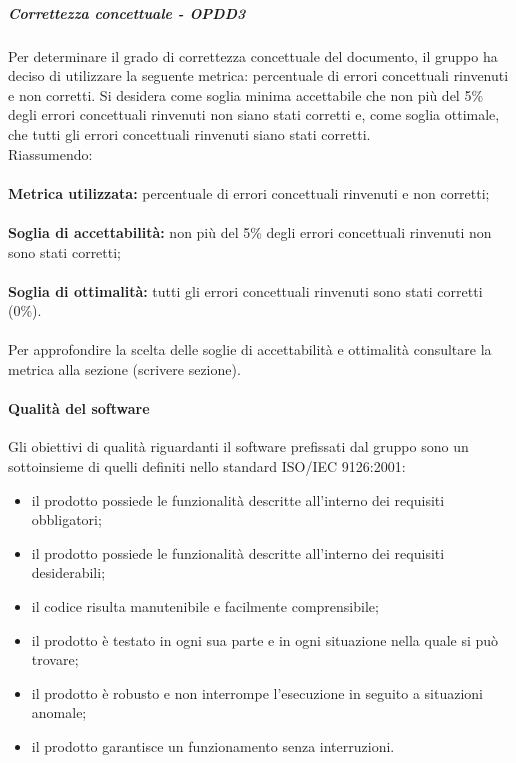 \documentclass[PianoDiQualifica.tex]{subfiles}
\begin{document}
				\subparagraph{Correttezza concettuale - OPDD3}
				Per determinare il grado di correttezza concettuale del documento, il gruppo ha deciso di utilizzare la seguente metrica: percentuale di errori concettuali rinvenuti e non corretti.
				Si desidera come soglia minima accettabile che non più del 5\% degli errori concettuali rinvenuti non siano stati corretti e, come soglia ottimale, che tutti gli errori
				concettuali rinvenuti siano stati corretti.\\
				Riassumendo: \\ \\
				\textbf{Metrica utilizzata:} percentuale di errori concettuali rinvenuti e non corretti; \\ \\
				\textbf{Soglia di accettabilità:} non più del 5\% degli errori concettuali rinvenuti non sono stati corretti;\\ \\
				\textbf{Soglia di ottimalità:} tutti gli errori concettuali rinvenuti sono stati corretti (0\%). \\ \\
				Per approfondire la scelta delle soglie di accettabilità e ottimalità consultare la metrica alla sezione (scrivere sezione).
				
			\paragraph{Qualità del software}
			Gli obiettivi di qualità riguardanti il software prefissati dal gruppo \GRUPPO{} sono un sottoinsieme di quelli definiti nello standard ISO/IEC 9126:2001:
			\begin{itemize}
				\item il prodotto possiede le funzionalità descritte all’interno dei requisiti obbligatori;
				\item il prodotto possiede le funzionalità descritte all’interno dei requisiti desiderabili;
				\item il codice risulta manutenibile e facilmente comprensibile;
				\item il prodotto è testato in ogni sua parte e in ogni situazione nella quale si può trovare;
				\item il prodotto è robusto e non interrompe l’esecuzione in seguito a situazioni anomale;
				\item il prodotto garantisce un funzionamento senza interruzioni.
			\end{itemize}
			
\end{document}

